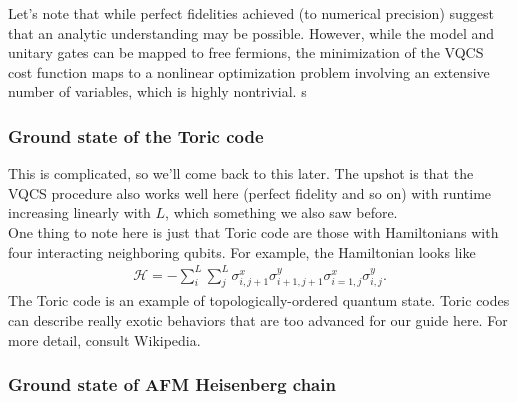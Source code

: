 \documentclass{book}
\theoremstyle{definition}
\newcommand{\had}{\mathcal{H}}
\begin{document}
Let's note that while perfect fidelities achieved (to numerical precision) suggest that an analytic understanding may be possible. However, while the model and unitary gates can be mapped to free fermions, the minimization of the VQCS cost function maps to a nonlinear optimization problem involving an extensive number of variables, which is highly nontrivial. s


















\subsubsection{Ground state of the Toric code}

This is complicated, so we'll come back to this later. The upshot is that the VQCS procedure also works well here (perfect fidelity and so on) with runtime increasing linearly with $L$, which something we also saw before.\\

One thing to note here is just that Toric code are those with Hamiltonians with four interacting neighboring qubits.  For example, the Hamiltonian looks like 
\begin{align}
\had = -\sum^L_i \sum^L_j \sigma^x_{i,j+1}\sigma^y_{i+1,j+1}\sigma^x_{i=1,j}\sigma^y_{i,j}.
\end{align}
The Toric code is an example of topologically-ordered quantum state. Toric codes can describe really exotic behaviors that are too advanced for our guide here. For more detail, consult Wikipedia. 

\subsubsection{Ground state of AFM Heisenberg chain}
\end{document}

